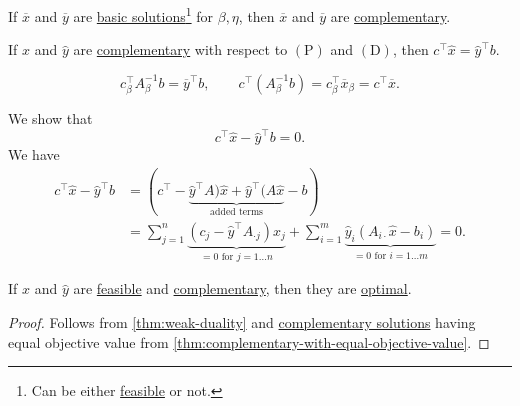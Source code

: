 \begin{theorem}\label{thm:lec10-1}
	If \(\overline{x}\) and \(\overline{y}\) are \hyperref[def:basic-solution]{basic solutions}\footnote{Can be either \hyperref[def:feasible-solution]{feasible} or not.} for \(\beta, \eta\), then \(\overline{x}\) and \(\overline{y}\) are \hyperref[def:complementary]{complementary}.
\end{theorem}

\begin{theorem}\label{thm:complementary-with-equal-objective-value}
	If \(\hat{x}\) and \(\hat{y}\) are \hyperref[def:complementary]{complementary} with respect to \((\mathrm{P})\) and \((\mathrm{D})\), then \(c^{\top}\hat{x} = \hat{y}^{\top} b\).
\end{theorem}
\begin{note}
	\[
		c^{\top}_{\beta} A^{-1}_{\beta}b = \overline{y}^{\top} b,\qquad c^{\top}(A^{-1}_{\beta} b) = c^{\top}_{\beta}\overline{x}_{\beta} = c^{\top}\overline{x}.
	\]
\end{note}
\begin{explanation}
	We show that
	\[
		c^{\top} \hat{x} - \hat{y}^{\top} b = 0.
	\]
	We have
	\[
		\begin{split}
			c^{\top} \hat{x} - \hat{y}^{\top} b &= (c^{\top} - \underbrace{\hat{y}^{\top}A)\hat{x} + \hat{y}^{\top}(A \hat{x}}_{\text{added terms}} - b)\\
			&=\sum\limits_{j=1}^{n} \underbrace{(c_{j}-\hat{y}^{\top}A_{\cdot j})x_{j}}_{ = 0\text{ for } j = 1\ldots n}
			+ \sum\limits_{i=1}^{m} \underbrace{\hat{y}_i(A_{i\cdot}\hat{x} - b_{i})}_{ = 0\text{ for } i = 1\ldots m}
			= 0.
		\end{split}
	\]
\end{explanation}

\begin{theorem}\label{thm:weak-complementary-slackness-theorem}
	If \(\hat{x}\) and \(\hat{y}\) are \hyperref[def:feasible-solution]{feasible} and \hyperref[def:complementary]{complementary}, then they are \hyperref[def:optimal-solution]{optimal}.
\end{theorem}
\begin{proof}
	Follows from \autoref{thm:weak-duality} and \hyperref[def:complementary]{complementary solutions} having equal objective value from \autoref{thm:complementary-with-equal-objective-value}.
\end{proof}

